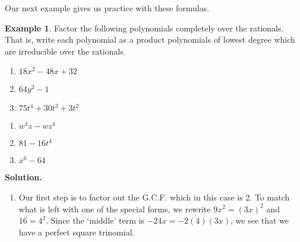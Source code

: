 \documentclass[11pt]{article}
\theoremstyle{definition}  %
\newtheorem{ex}{\bf Example}
\newcounter{HW}
\begin{document}
\medskip

Our next example gives us practice with these formulas.

\begin{ex}\label{FormulaFactoring}  Factor the following polynomials completely over the rationals.  That is, write each polynomial as a product polynomials of lowest degree which are irreducible over the rationals. 

\begin{multicols}{3}

\begin{enumerate}

\item  $18x^2 - 48x + 32$  

\item  $64y^2 - 1$ 

\item  $75t^4 + 30t^3 + 3t^2$


\setcounter{HW}{\value{enumi}}

\end{enumerate}

\end{multicols}

\begin{multicols}{3}

\begin{enumerate}

\setcounter{enumi}{\value{HW}}


\item  $w^4 z - w z^4$

\item  \label{quadinform1} $81 - 16t^4$ 

\item  \label{quadinform2} $x^6 - 64$

\setcounter{HW}{\value{enumi}}

\end{enumerate}

\end{multicols}

{\bf Solution.}

\begin{enumerate}
\item  Our first step is to factor out the G.C.F. which in this case is $2$.  To match what is left with one of the special forms, we rewrite $9x^2 = (3x)^2$ and $16 = 4^2$. Since the `middle' term is $-24x = -2(4)(3x)$, we see that we have a perfect square trinomial.\[ \begin{array}{rclr}


\end{array}\]
\end{enumerate}
\end{ex}
\end{document}
